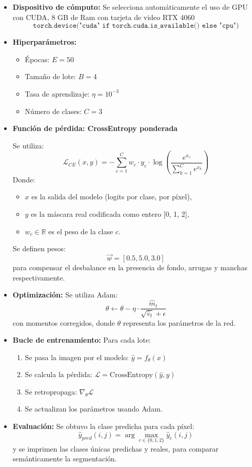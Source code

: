 \begin{itemize}
    \item \textbf{Dispositivo de cómputo:} Se selecciona automáticamente el uso de GPU con CUDA, 8 GB de Ram con tarjeta de video RTX 4060
    \[
    \texttt{torch.device("cuda" if torch.cuda.is\_available() else "cpu")}
    \]
    
    \item \textbf{Hiperparámetros:}
    \begin{itemize}
        \item Épocas: \( E = 50 \)
        \item Tamaño de lote: \( B = 4 \)
        \item Tasa de aprendizaje: \( \eta = 10^{-3} \)
        \item Número de clases: \( C = 3 \)
    \end{itemize}

    \item \textbf{Función de pérdida: CrossEntropy ponderada}

    Se utiliza:
    \[
    \mathcal{L}_{CE}(x, y) = - \sum_{c=1}^{C} w_c \cdot y_c \cdot \log \left( \frac{e^{x_c}}{\sum_{k=1}^{C} e^{x_k}} \right)
    \]
    Donde:
    \begin{itemize}
        \item \( x \) es la salida del modelo (logits por clase, por píxel),
        \item \( y \) es la máscara real codificada como entero [0, 1, 2],
        \item \( w_c \in \mathbb{R} \) es el peso de la clase \(c\).
    \end{itemize}
    Se definen pesos:
    \[
    \vec{w} = [0.5, 5.0, 3.0]
    \]
    para compensar el desbalance en la presencia de fondo, arrugas y manchas respectivamente.

    \item \textbf{Optimización:} Se utiliza Adam:
    \[
    \theta \leftarrow \theta - \eta \cdot \frac{\hat{m}_t}{\sqrt{\hat{v}_t} + \epsilon}
    \]
    con momentos corregidos, donde \(\theta\) representa los parámetros de la red.

    \item \textbf{Bucle de entrenamiento:} Para cada lote:
    \begin{enumerate}
        \item Se pasa la imagen por el modelo: \( \hat{y} = f_\theta(x) \)
        \item Se calcula la pérdida: \( \mathcal{L} = \text{CrossEntropy}(\hat{y}, y) \)
        \item Se retropropaga: \( \nabla_\theta \mathcal{L} \)
        \item Se actualizan los parámetros usando Adam.
    \end{enumerate}

    \item \textbf{Evaluación:} Se obtuvo la clase predicha para cada píxel:
    \[
    \hat{y}_{pred}(i,j) = \arg\max_{c \in \{0,1,2\}} \hat{y}_{c}(i,j)
    \]
    y se imprimen las clases únicas predichas y reales, para comparar semánticamente la segmentación.
\end{itemize}

